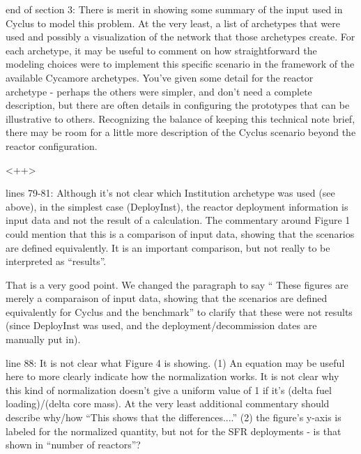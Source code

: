 \documentclass[answers,11pt]{exam}
\begin{document}
\begin{questions}
        \question end of section 3: There is merit in showing some summary of 
        the input used in Cyclus to model this problem.  At the very least, a 
        list of archetypes that were used and possibly a visualization of the 
        network that those archetypes create.  For each archetype, it may be 
        useful to comment on how straightforward the modeling choices were to 
        implement this specific scenario in the framework of the available 
        Cycamore archetypes.  You've given some detail for the reactor 
        archetype - perhaps the others were simpler, and don't need a complete 
        description, but there are often details in configuring the prototypes 
        that can be illustrative to others.  Recognizing the balance of keeping 
        this technical note brief, there may be room for a little more 
        description of the Cyclus scenario beyond the reactor configuration.

        \begin{solution}
        <++>
        \end{solution}

        \question lines 79-81: Although it's not clear which Institution 
        archetype was used (see above), in the simplest case (DeployInst), the 
        reactor deployment information is input data and not the result of a 
        calculation.  The commentary around Figure 1 could mention that this is 
        a comparison of input data, showing that the scenarios are defined 
        equivalently.  It is an important comparison, but not really to be 
        interpreted as ``results''.

        \begin{solution}
        That is a very good point. We changed the paragraph to say
        `` These figures are merely a comparaison of input data, showing that
        the scenarios are defined equivalently for Cyclus and the benchmark''
        to clarify that these were not results (since DeployInst was used,
        and the deployment/decommission dates are manually put in).
        \end{solution}


        \question line 88: It is not clear what Figure 4 is showing.  (1) An 
        equation may be useful here to more clearly indicate how the 
        normalization works. It is not clear why this kind of normalization 
        doesn't give a uniform value of 1 if it's (delta fuel loading)/(delta 
        core mass).  At the very least additional commentary should describe 
        why/how ``This shows that the differences....''  (2) the figure's 
        y-axis is labeled for the normalized quantity, but not for the SFR 
        deployments - is that shown in ``number of reactors''?


\end{questions}
\end{document}
